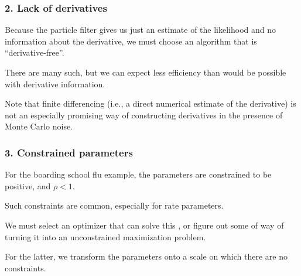 \documentclass{beamer}\usepackage[]{graphicx}\usepackage[]{color}
\begin{document}
\begin{frame}[fragile]
\frametitle{2. Lack of derivatives}
\bi
\item Because the particle filter gives us just an estimate of the likelihood and no information about the derivative, we must choose an algorithm that is ``derivative-free''.
\item
There are many such, but we can expect less efficiency than would be possible with derivative information.
\item
Note that finite differencing (i.e., a direct numerical estimate of the derivative) is not an especially promising way of constructing derivatives in the presence of Monte Carlo noise.
\ei
\end{frame}


\begin{frame}[fragile]
\frametitle{3. Constrained parameters}

\bi
\item For the boarding school flu example, the parameters are constrained to be positive, and $\rho < 1$.
\item Such constraints are common, especially for rate parameters.
\item We must select an optimizer that can solve this , or figure out some of way of turning it into an unconstrained maximization problem.
\item 
For the latter, we transform the parameters onto a scale on which there are no constraints.
\ei

\end{frame}
\end{document}
